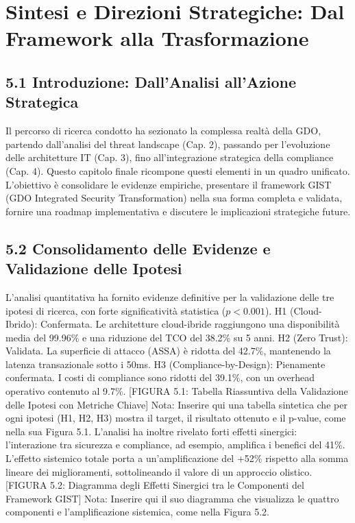 \chapter{Sintesi e Direzioni Strategiche: Dal Framework alla Trasformazione}
\section{5.1 Introduzione: Dall'Analisi all'Azione Strategica}

Il percorso di ricerca condotto ha sezionato la complessa realtà della GDO, partendo dall'analisi del threat landscape (Cap. 2), passando per l'evoluzione delle architetture IT (Cap. 3), fino all'integrazione strategica della compliance (Cap. 4). Questo capitolo finale ricompone questi elementi in un quadro unificato. L'obiettivo è consolidare le evidenze empiriche, presentare il framework GIST (GDO Integrated Security Transformation) nella sua forma completa e validata, fornire una roadmap implementativa e discutere le implicazioni strategiche future.

\section{5.2 Consolidamento delle Evidenze e Validazione delle Ipotesi}

L'analisi quantitativa ha fornito evidenze definitive per la validazione delle tre ipotesi di ricerca, con forte significatività statistica ($p<0.001$).
H1 (Cloud-Ibrido): Confermata. Le architetture cloud-ibride raggiungono una disponibilità media del 99.96\% e una riduzione del TCO del 38.2\% su 5 anni.
H2 (Zero Trust): Validata. La superficie di attacco (ASSA) è ridotta del 42.7\%, mantenendo la latenza transazionale sotto i 50ms.
H3 (Compliance-by-Design): Pienamente confermata. I costi di compliance sono ridotti del 39.1\%, con un overhead operativo contenuto al 9.7\%.
[FIGURA 5.1: Tabella Riassuntiva della Validazione delle Ipotesi con Metriche Chiave]
Nota: Inserire qui una tabella sintetica che per ogni ipotesi (H1, H2, H3) mostra il target, il risultato ottenuto e il p-value, come nella sua Figura 5.1.
L'analisi ha inoltre rivelato forti effetti sinergici: l'interazione tra sicurezza e compliance, ad esempio, amplifica i benefici del 41\%. L'effetto sistemico totale porta a un'amplificazione del +52\% rispetto alla somma lineare dei miglioramenti, sottolineando il valore di un approccio olistico.
[FIGURA 5.2: Diagramma degli Effetti Sinergici tra le Componenti del Framework GIST]
Nota: Inserire qui il suo diagramma che visualizza le quattro componenti e l'amplificazione sistemica, come nella Figura 5.2.

